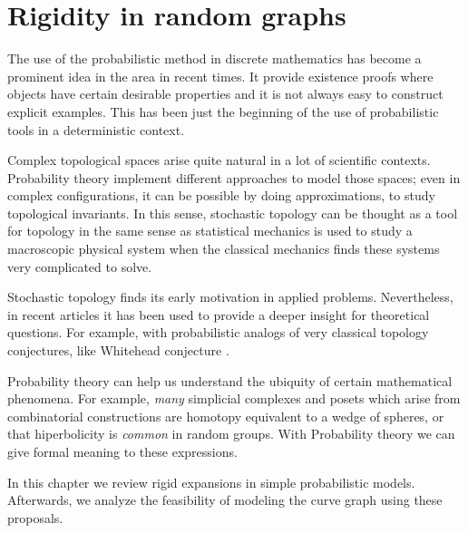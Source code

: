 
\chapter{Rigidity in random graphs} %

\label{Chapter2} %



The use of the probabilistic method in discrete mathematics has become a prominent idea in the area in recent times. It provide existence proofs where objects have certain desirable properties and it is not always easy to construct explicit examples. This has been just the beginning of the use of probabilistic tools in a deterministic context.

Complex topological spaces arise quite natural in a lot of scientific contexts. Probability theory implement different approaches to model those spaces; even in complex configurations, it can be possible by doing approximations, to study topological invariants. In this sense, stochastic topology can be thought as a tool for topology in the same sense as statistical mechanics is used to study a macroscopic physical system when the classical mechanics finds these systems very complicated to solve. 

Stochastic topology finds its early motivation in applied problems. Nevertheless, in recent articles it has been used to provide a deeper insight for theoretical questions. For example, with probabilistic analogs of very classical topology conjectures, like Whitehead conjecture \cite{Costa15}.

Probability theory can help us understand the ubiquity of certain mathematical phenomena. For example, \textit{many} simplicial complexes and posets which arise from combinatorial constructions are homotopy equivalent to a wedge of spheres, or that hiperbolicity is \textit{common} in random groups. With Probability theory we can give formal meaning to these expressions.

In this chapter we review rigid expansions in simple probabilistic models. Afterwards, we analyze the feasibility of modeling the curve graph using these proposals.

